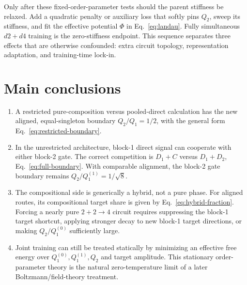 \documentclass[11pt]{article}
\begin{document}
Only after these fixed-order-parameter tests should the parent stiffness be relaxed.  Add a
quadratic penalty or auxiliary loss that softly pins \(Q_2\), sweep its stiffness, and fit the
effective potential \(\Phi\) in Eq.~\eqref{eq:landau}.  Fully simultaneous \(d2+d4\) training
is the zero-stiffness endpoint.  This sequence separates three effects that are otherwise
confounded: extra circuit topology, representation adaptation, and training-time lock-in.

\section{Main conclusions}

\begin{enumerate}
    \item A restricted pure-composition versus pooled-direct calculation has the new aligned,
    equal-singleton boundary \(Q_2/Q_1=1/2\), with the general form
    Eq.~\eqref{eq:restricted-boundary}.

    \item In the unrestricted architecture, block-1 direct signal can cooperate with either
    block-2 gate.  The correct competition is \(D_1+C\) versus \(D_1+D_2\),
    Eq.~\eqref{eq:full-boundary}.  With comparable alignment, the block-2 gate boundary remains
    \(Q_2/Q_1^{(1)}=1/\sqrt8\).

    \item The compositional side is generically a hybrid, not a pure phase.  For aligned
    routes, its compositional target share is given by Eq.~\eqref{eq:hybrid-fraction}.  Forcing
    a nearly pure \(2+2\to4\) circuit requires suppressing the block-1 target shortcut, applying
    stronger decay to new block-1 target directions, or making \(Q_2/Q_1^{(0)}\) sufficiently
    large.

    \item Joint training can still be treated statically by minimizing an effective free energy
    over \(Q_1^{(0)},Q_1^{(1)},Q_2\) and target amplitude.  This stationary order-parameter
    theory is the natural zero-temperature limit of a later Boltzmann/field-theory treatment.
\end{enumerate}
\end{document}
